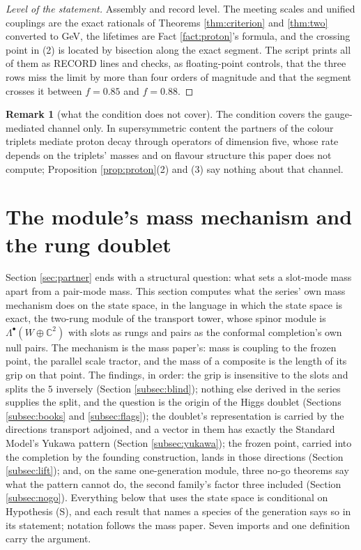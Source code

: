 \documentclass[11pt]{article}
\theoremstyle{definition}
\newtheorem{remark}[theorem]{Remark}
\newcommand{\C}{\mathbb{C}}
\begin{document}
\begin{proof}[Level of the statement]
Assembly and record level. The meeting scales and unified couplings are the exact rationals of Theorems \ref{thm:criterion} and \ref{thm:two} converted to GeV, the lifetimes are Fact \ref{fact:proton}'s formula, and the crossing point in (2) is located by bisection along the exact segment. The script prints all of them as RECORD lines and checks, as floating-point controls, that the three rows miss the limit by more than four orders of magnitude and that the segment crosses it between $f = 0.85$ and $f = 0.88$.
\end{proof}

\begin{remark}[what the condition does not cover]\label{rem:dimfive}
The condition covers the gauge-mediated channel only. In supersymmetric content the partners of the colour triplets mediate proton decay through operators of dimension five, whose rate depends on the triplets' masses and on flavour structure this paper does not compute; Proposition \ref{prop:proton}(2) and (3) say nothing about that channel.
\end{remark}


\section{The module's mass mechanism and the rung doublet}\label{sec:mechanism}

Section \ref{sec:partner} ends with a structural question: what sets a slot-mode mass apart from a pair-mode mass. This section computes what the series' own mass mechanism does on the state space, in the language in which the state space is exact, the two-rung module of the transport tower, whose spinor module is $\Lambda^{\bullet}(W \oplus \C^{2})$ with slots as rungs and pairs as the conformal completion's own null pairs. The mechanism is the mass paper's: mass is coupling to the frozen point, the parallel scale tractor, and the mass of a composite is the length of its grip on that point. The findings, in order: the grip is insensitive to the slots and splits the $5$ inversely (Section \ref{subsec:blind}); nothing else derived in the series supplies the split, and the question is the origin of the Higgs doublet (Sections \ref{subsec:books} and \ref{subsec:flags}); the doublet's representation is carried by the directions transport adjoined, and a vector in them has exactly the Standard Model's Yukawa pattern (Section \ref{subsec:yukawa}); the frozen point, carried into the completion by the founding construction, lands in those directions (Section \ref{subsec:lift}); and, on the same one-generation module, three no-go theorems say what the pattern cannot do, the second family's factor three included (Section \ref{subsec:nogo}). Everything below that uses the state space is conditional on Hypothesis (S), and each result that names a species of the generation says so in its statement; notation follows the mass paper. Seven imports and one definition carry the argument.
\end{document}

